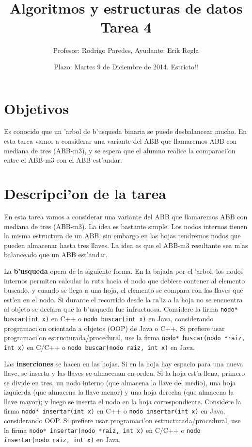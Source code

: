 \documentclass[11pt]{utalcaDoc}
\title{{\bf Algoritmos y estructuras de datos}\\Tarea 4}
\author{Profesor: Rodrigo Paredes, Ayudante: Erik Regla}
\date{Plazo: Martes 9 de Diciembre de 2014. Estricto!!}
\begin{document}
\renewcommand{\figurename}{Figura~}
\renewcommand{\tablename}{Tabla~}

\maketitle

\section{Objetivos}


Es conocido que un 'arbol de b'usqueda binaria se puede desbalancear mucho.
En esta tarea vamos a considerar una variante del ABB que llamaremos
ABB con mediana de tres (ABB-m3), y se espera que el alumno realice la comparaci'on
entre el ABB-m3 con el ABB est'andar.


\section{Descripci'on de la tarea}

En esta tarea vamos a considerar una variante del ABB que llamaremos
ABB con mediana de tres (ABB-m3). La idea es bastante simple. Los nodos
internos tienen la misma estructura de un ABB, sin embargo en las hojas tendremos
nodos que pueden almacenar hasta tres llaves. La idea es que el ABB-m3 resultante
sea m'as balanceado que un ABB est'andar.

La {\bf b'usqueda} opera de la siguiente forma. En la bajada por el 'arbol, los nodos
internos permiten calcular la ruta hacia el nodo que debiese contener al elemento buscado,
y cuando se llega a una hoja, el elemento se compara con las llaves que est'en en el nodo.
Si durante el recorrido desde la ra'iz a la hoja no se encuentra al objeto se declara
que la b'usqueda fue infructuosa.
Considere la firma {\tt nodo* buscar(int x)} en C++ o {\tt nodo buscar(int x)} en Java,
considerando programaci'on orientada a objetos (OOP) de Java o C++.
Si prefiere usar programaci'on estructurada/procedural, use la firma
{\tt nodo* buscar(nodo *raiz, int x)} en C/C++ o {\tt nodo buscar(nodo raiz, int x)} en Java.

Las {\bf inserciones} se hacen en las hojas.
Si en la hoja hay espacio para una nueva llave, se inserta y las llaves se almacenan en orden.
Si la hoja est'a llena, primero se divide en tres, un nodo interno (que almacena la
llave del medio), una hoja izquierda (que almacena la llave menor) y
una hoja derecha (que almacena la llave mayor); y luego se inserta el nodo en
la hoja correspondiente.
Considere la firma {\tt nodo* insertar(int x)} en C++ o {\tt nodo insertar(int x)} en Java,
considerando OOP.
Si prefiere usar programaci'on estructurada/procedural, use la firma
{\tt nodo* insertar(nodo *raiz, int x)} en C/C++ o {\tt nodo insertar(nodo raiz, int x)} en Java.
\end{document}
